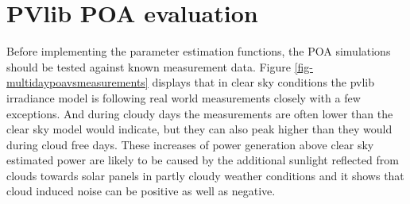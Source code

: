 

\newpage
\section{PVlib POA evaluation}

Before implementing the parameter estimation functions, the POA simulations should be tested against known measurement data. Figure \ref{fig-multidaypoavsmeasurements} displays that in clear sky conditions the pvlib irradiance model is following real world measurements closely with a few exceptions. And during cloudy days the measurements are often lower than the clear sky model would indicate, but they can also peak higher than they would during cloud free days. These increases of power generation above clear sky estimated power are likely to be caused by the additional sunlight reflected from clouds towards solar panels in partly cloudy weather conditions and it shows that cloud induced noise can be positive as well as negative. 



